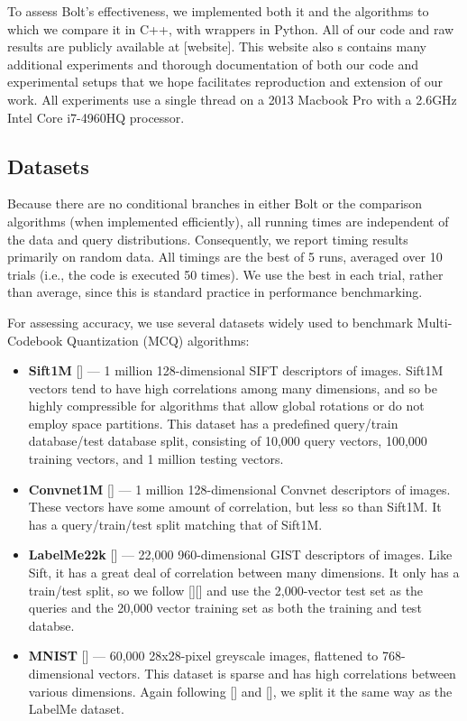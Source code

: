 
To assess Bolt's effectiveness, we implemented both it and the algorithms to which we compare it in C++, with wrappers in Python. All of our code and raw results are publicly available at [website]. This website also s contains many additional experiments and thorough documentation of both our code and experimental setups that we hope facilitates reproduction and extension of our work. All experiments use a single thread on a 2013 Macbook Pro with a 2.6GHz Intel Core i7-4960HQ processor. %

\subsection{Datasets}

Because there are no conditional branches in either Bolt or the comparison algorithms (when implemented efficiently), all running times are independent of the data and query distributions. Consequently, we report timing results primarily on random data. All timings are the best of 5 runs, averaged over 10 trials (i.e., the code is executed 50 times). We use the best in each trial, rather than average, since this is standard practice in performance benchmarking.

For assessing accuracy, we use several datasets widely used to benchmark Multi-Codebook Quantization (MCQ) algorithms:
\begin{itemize}
\item \textbf{Sift1M} [] --- 1 million 128-dimensional SIFT descriptors of images. Sift1M vectors tend to have high correlations among many dimensions, and so be highly compressible for algorithms that allow global rotations or do not employ space partitions. This dataset has a predefined query/train database/test database split, consisting of 10,000 query vectors, 100,000 training vectors, and 1 million testing vectors.
\item \textbf{Convnet1M} [] --- 1 million 128-dimensional Convnet descriptors of images. These vectors have some amount of correlation, but less so than Sift1M. It has a query/train/test split matching that of Sift1M.
\item \textbf{LabelMe22k} [] --- 22,000 960-dimensional GIST descriptors of images. Like Sift, it has a great deal of correlation between many dimensions. It only has a train/test split, so we follow [][] and use the 2,000-vector test set as the queries and the 20,000 vector training set as both the training and test databse.
\item \textbf{MNIST} [] --- 60,000 28x28-pixel greyscale images, flattened to 768-dimensional vectors. This dataset is sparse and has high correlations between various dimensions. Again following [] and [], we split it the same way as the LabelMe dataset.
\end{itemize}

